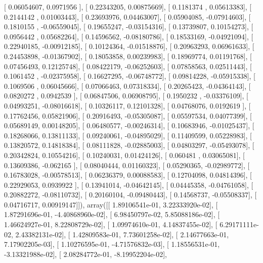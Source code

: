 \documentclass{article}
\begin{document}
       [ 0.06054607,  0.0971956 ],
       [ 0.22343205,  0.00875669],
       [ 0.1181374 ,  0.05613383],
       [ 0.2144142 ,  0.01003443],
       [ 0.23693976,  0.04463007],
       [ 0.05904085, -0.07914603],
       [ 0.1810155 , -0.06559045],
       [ 0.19655247, -0.03154316],
       [ 0.13739807,  0.10154273],
       [ 0.0956442 ,  0.05682264],
       [ 0.14596562, -0.08180786],
       [ 0.18533169, -0.04921094],
       [ 0.22940185, -0.00912185],
       [ 0.10124364, -0.01518876],
       [ 0.20963293,  0.06961633],
       [ 0.24453898, -0.01367902],
       [ 0.18053858,  0.00239983],
       [ 0.18969774,  0.01191768],
       [ 0.07456493,  0.12125748],
       [ 0.08422179, -0.06252603],
       [ 0.07858563,  0.02511443],
       [ 0.1061452 , -0.02375958],
       [ 0.16627295, -0.06748772],
       [ 0.09814228, -0.05915338],
       [ 0.1069506 ,  0.06045666],
       [ 0.07066463,  0.07318334],
       [ 0.20265423, -0.04364143],
       [ 0.0820272 ,  0.0942539 ],
       [ 0.06847506,  0.06908795],
       [ 0.1950232 , -0.03376109],
       [ 0.04993251, -0.08016618],
       [ 0.10326117,  0.12101328],
       [ 0.04768076,  0.0192619 ],
       [ 0.17762456,  0.05821906],
       [ 0.20916493, -0.05305087],
       [ 0.05597534,  0.04077399],
       [ 0.05689149,  0.00148205],
       [ 0.06480577, -0.00246314],
       [ 0.10683946, -0.01025437],
       [ 0.18268066,  0.13811133],
       [ 0.09240061, -0.04895029],
       [ 0.11409599,  0.05228983],
       [ 0.13820572,  0.14818384],
       [ 0.08111828, -0.02885003],
       [ 0.04803297, -0.05493078],
       [ 0.20342824,  0.10554216],
       [ 0.10240031,  0.01424126],
       [ 0.060481  ,  0.03065081],
       [ 0.13609386, -0.062165  ],
       [ 0.08040444,  0.01160323],
       [ 0.05290365, -0.02989772],
       [ 0.16783028, -0.00578513],
       [ 0.06236379,  0.00088583],
       [ 0.12704098,  0.04814396],
       [ 0.22929053,  0.0939922 ],
       [ 0.13941014, -0.04642145],
       [ 0.04445358, -0.04761058],
       [ 0.20882272, -0.08110732],
       [ 0.20160104, -0.09480443],
       [ 0.14568737, -0.05508337],
       [ 0.04716717,  0.00919147]]), array([[  1.89106541e-01,   3.22333920e-02],
       [  1.87291696e-01,  -4.40868960e-02],
       [  6.98450797e-02,   5.85088186e-02],
       [  1.46624927e-01,   8.22808729e-02],
       [  1.09974610e-01,   4.14837455e-02],
       [  6.29171111e-02,   2.43382131e-02],
       [  1.42809583e-01,   7.73601258e-02],
       [  2.14677663e-01,   7.17902205e-03],
       [  1.10276595e-01,  -4.71576832e-03],
       [  1.18556531e-01,  -3.13321988e-02],
       [  2.08284772e-01,  -8.19952204e-02],
\end{document}
